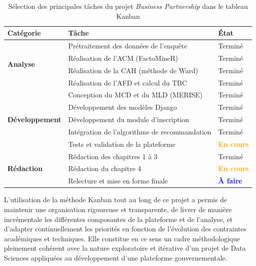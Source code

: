\begin{table}[H]
	\centering
	\caption{Sélection des principales tâches du projet \textit{Business Partnership} dans le tableau Kanban}
	\label{tab:kanban_taches}
	\renewcommand{\arraystretch}{1.3}
	\begin{tabularx}{\textwidth}{l X >{\centering\arraybackslash}p{2.5cm}}
		\toprule
		\rowcolor{primary!15}
		\textbf{Catégorie} & \textbf{Tâche} & \textbf{État} \\
		\midrule
		
		\multirow{4}{*}{\textbf{Analyse}}
		& Prétraitement des données de l'enquête & \textcolor{green!60!black}{Terminé} \\
		& Réalisation de l'ACM (FactoMineR) & \textcolor{green!60!black}{Terminé} \\
		& Réalisation de la CAH (méthode de Ward) & \textcolor{green!60!black}{Terminé} \\
		& Réalisation de l'AFD et calcul du TBC & \textcolor{green!60!black}{Terminé} \\
		
		\midrule
		
		\multirow{5}{*}{\textbf{Développement}}
		& Conception du MCD et du MLD (MERISE) & \textcolor{green!60!black}{Terminé} \\
		& Développement des modèles Django & \textcolor{green!60!black}{Terminé} \\
		& Développement du module d'inscription & \textcolor{green!60!black}{Terminé} \\
		& Intégration de l'algorithme de recommandation & \textcolor{green!60!black}{Terminé} \\
		& Tests et validation de la plateforme & \textcolor{orange}{\textbf{En cours}} \\
		
		\midrule
		
		\multirow{3}{*}{\textbf{Rédaction}}
		& Rédaction des chapitres 1 à 3 & \textcolor{green!60!black}{Terminé} \\
		& Rédaction du chapitre 4 & \textcolor{orange}{\textbf{En cours}} \\
		& Relecture et mise en forme finale & \textcolor{blue}{\textbf{À faire}} \\
		
		\bottomrule
	\end{tabularx}
\end{table}
L'utilisation de la méthode Kanban tout au long de ce projet a
permis de maintenir une organisation rigoureuse et transparente,
de livrer de manière incrémentale les différentes composantes de
la plateforme et de l'analyse, et d'adapter continuellement les
priorités en fonction de l'évolution des contraintes académiques
et techniques. Elle constitue en ce sens un cadre méthodologique
pleinement cohérent avec la nature exploratoire et itérative d'un
projet de Data Sciences appliquées au développement d'une plateforme
gouvernementale.
